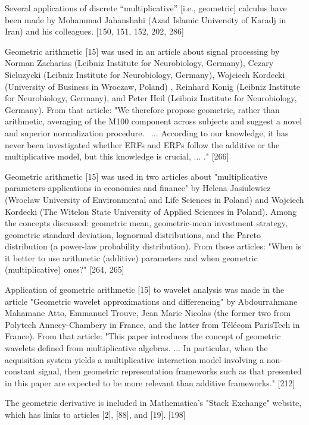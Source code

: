\documentclass[12pt]{article}
\begin{document}
Several applications of discrete “multiplicative” [i.e., geometric] calculus have been made by Mohammad Jahanshahi (Azad Islamic University of Karadj in Iran) and his colleagues. [150, 151, 152, 202, 286]

Geometric arithmetic [15] was used in an article about signal processing by Norman Zacharias (Leibniz Institute for Neurobiology, Germany), Cezary Sieluzycki (Leibniz Institute for Neurobiology, Germany), Wojciech Kordecki (University of Business in Wroczaw, Poland) , Reinhard Konig (Leibniz Institute for Neurobiology, Germany), and Peter Heil (Leibniz Institute for Neurobiology, Germany). From that article: "We therefore propose geometric, rather than arithmetic, averaging of the M100 component across subjects and suggest a novel and superior normalization procedure.  ... According to our knowledge, it has never been investigated whether ERFs and ERPs follow the additive or the multiplicative model, but this knowledge is crucial, ... ." [266]

Geometric arithmetic [15] was used in two articles about "multiplicative parameters-applications in economics and finance" by Helena Jasiulewicz (Wrocław University of Environmental and Life Sciences in Poland) and Wojciech Kordecki (The Witelon State University of Applied Sciences in Poland). Among the concepts discussed: geometric mean, geometric-mean investment strategy, geometric standard deviation, lognormal distributions, and the Pareto distribution (a power-law probability distribution). From those articles: "When is it better to use arithmetic (additive) parameters and when geometric (multiplicative) ones?" [264, 265]

Application of geometric arithmetic [15] to wavelet analysis was made in the article "Geometric wavelet approximations and differencing" by Abdourrahmane Mahamane Atto, Emmanuel Trouve, Jean Marie Nicolas (the former two from Polytech Annecy-Chambery in France, and the latter from Télécom ParisTech in France). From that article: "This paper introduces the concept of geometric wavelets defined from multiplicative algebras. ... In particular, when the acquisition system yields a multiplicative interaction model involving a non-constant signal, then geometric representation frameworks such as that presented in this paper are expected to be more relevant than additive frameworks." [212]

The geometric derivative is included in Mathematica's "Stack Exchange" website, which has links to articles [2], [88], and [19]. [198]
\end{document}
